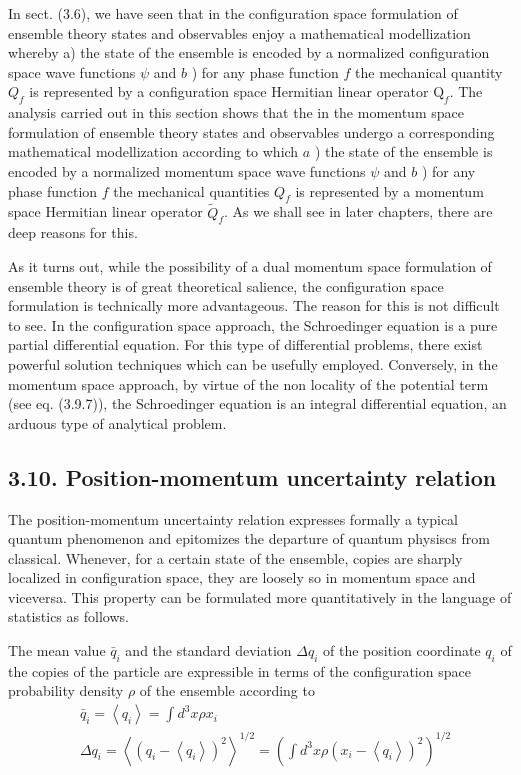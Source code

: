 \documentclass{article}
\begin{document}
In sect. (3.6), we have seen that in the configuration space formulation of ensemble theory states and observables enjoy a mathematical modellization whereby a) the state of the ensemble is encoded by a normalized configuration space wave functions $\psi$ and $b$ ) for any phase function $f$ the mechanical quantity $Q_{f}$ is represented by a configuration space Hermitian linear operator $\mathrm{Q}_{f}$. The analysis carried out in this section shows that the in the momentum space formulation of ensemble theory states and observables undergo a corresponding mathematical modellization according to which $a$ ) the state of the ensemble is encoded by a normalized momentum space wave functions $\psi$ and $b$ ) for any phase function $f$ the mechanical quantities $Q_{f}$ is represented by a momentum space Hermitian linear operator $\tilde{Q}_{f}$. As we shall see in later chapters, there are deep reasons for this.

As it turns out, while the possibility of a dual momentum space formulation of ensemble theory is of great theoretical salience, the configuration space formulation is technically more advantageous. The reason for this is not difficult to see. In the configuration space approach, the Schroedinger equation is a pure partial differential equation. For this type of differential problems, there exist powerful solution techniques which can be usefully employed. Conversely, in the momentum space approach, by virtue of the non locality of the potential term (see eq. (3.9.7)), the Schroedinger equation is an integral differential equation, an arduous type of analytical problem.

\subsection*{3.10. Position-momentum uncertainty relation}

The position-momentum uncertainty relation expresses formally a typical quantum phenomenon and epitomizes the departure of quantum physiscs from classical. Whenever, for a certain state of the ensemble, copies are sharply localized in configuration space, they are loosely so in momentum space and viceversa. This property can be formulated more quantitatively in the language of statistics as follows.

The mean value $\bar{q}_{i}$ and the standard deviation $\Delta q_{i}$ of the position coordinate $q_{i}$ of the copies of the particle are expressible in terms of the configuration space probability density $\rho$ of the ensemble according to
$$
\begin{align*}
& \bar{q}_{i}=\left\langle q_{i}\right\rangle=\int d^{3} x \rho x_{i}  \tag{3.10.1}\\
& \Delta q_{i}=\left\langle\left(q_{i}-\left\langle q_{i}\right\rangle\right)^{2}\right\rangle^{1 / 2}=\left(\int d^{3} x \rho\left(x_{i}-\left\langle q_{i}\right\rangle\right)^{2}\right)^{1 / 2} \tag{3.10.2}
\end{align*}
$$
\end{document}
